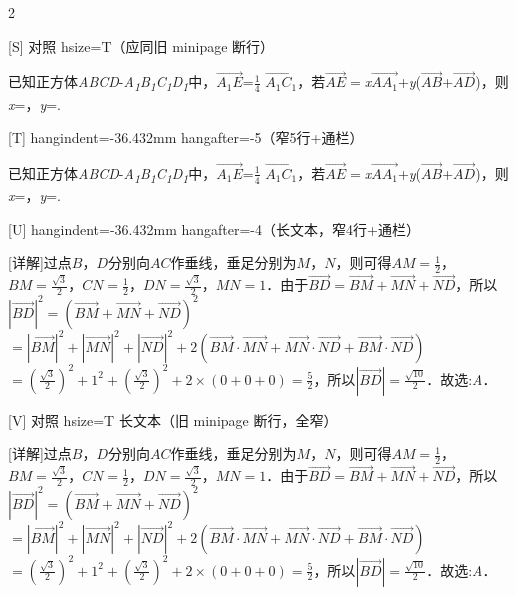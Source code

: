 \documentclass[fontset=none]{ctexart}
\begin{document}
\begin{multicols}{2}
\def\QPTEXT{已知正方体\emph{ABCD}-\emph{A\textsubscript{1}B\textsubscript{1}C\textsubscript{1}D\textsubscript{1}}中，\(\overrightarrow{A_{1}E}\)=\(\frac{1}{4}\) \(\overrightarrow{A_{1}C_{1}}\)，若\(\overrightarrow{AE} =\)\emph{x}\(\overrightarrow{AA_{1}}\)+\emph{y}(\(\overrightarrow{AB}\)+\(\overrightarrow{AD}\))，则\emph{x}\nobreak=\kongbai{}，\emph{y}\nobreak=\kongbai{}.}
\def\QPLONG{[详解]过点\(B\)，\(D\)分别向\(AC\)作垂线，垂足分别为\(M\)，\(N\)，则可得\(AM = \frac{1}{2}\)，\(BM = \frac{\sqrt{3}}{2}\)，\(CN = \frac{1}{2}\)，\(DN = \frac{\sqrt{3}}{2}\)，\(MN = 1\)．由于\(\overrightarrow{BD} = \overrightarrow{BM} + \overrightarrow{MN} + \overrightarrow{ND}\)，所以\(|\overrightarrow{BD}|^{2} = {(\overrightarrow{BM} + \overrightarrow{MN} + \overrightarrow{ND})}^{2}\)\allowbreak\(= |\overrightarrow{BM}|^{2} + |\overrightarrow{MN}|^{2} + |\overrightarrow{ND}|^{2} + 2(\overrightarrow{BM} \cdot \overrightarrow{MN} + \overrightarrow{MN} \cdot \overrightarrow{ND} + \overrightarrow{BM} \cdot \overrightarrow{ND})\)\allowbreak\(= ( \frac{\sqrt{3}}{2} )^{2} + 1^{2} + ( \frac{\sqrt{3}}{2} )^{2} + 2 \times (0 + 0 + 0) = \frac{5}{2}\)，所以\(|\overrightarrow{BD}| = \frac{\sqrt{10}}{2}\)．故选:\emph{A}．}

[S] 对照 hsize=T（应同旧 minipage 断行）\par
\noindent\begingroup\hsize=46.368mm\raggedright \QPTEXT\par\endgroup
\vspace{3mm}

[T] hangindent=-36.432mm hangafter=-5（窄5行+通栏）\par
\noindent\begingroup\hangindent=-36.432mm\raggedright \QPTEXT\par\endgroup
\vspace{3mm}

[U] hangindent=-36.432mm hangafter=-4（长文本，窄4行+通栏）\par
\noindent\begingroup\hangindent=-36.432mm\raggedright \QPLONG\par\endgroup
\vspace{3mm}

[V] 对照 hsize=T 长文本（旧 minipage 断行，全窄）\par
\noindent\begingroup\hsize=46.368mm\raggedright \QPLONG\par\endgroup
\end{multicols}
\end{document}
